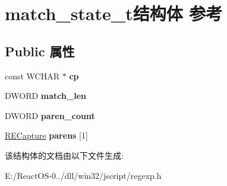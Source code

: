 \hypertarget{structmatch__state__t}{}\section{match\+\_\+state\+\_\+t结构体 参考}
\label{structmatch__state__t}
\subsection*{Public 属性}
\begin{DoxyCompactItemize}
\item 
\mbox{\label{structmatch__state__t_a8effd1384fdb94f8bc24cb4d4aa8e1f9}} 
const W\+C\+H\+AR $\ast$ {\bfseries cp}
\item 
\mbox{\label{structmatch__state__t_a29d207e7b3d550d8186223d103d62dd5}} 
D\+W\+O\+RD {\bfseries match\+\_\+len}
\item 
\mbox{\label{structmatch__state__t_ae3fadae194e8fdbc0b835c61d2632202}} 
D\+W\+O\+RD {\bfseries paren\+\_\+count}
\item 
\mbox{\label{structmatch__state__t_a3028709a531a4c57b4bf2e95203874af}} 
\hyperlink{struct_r_e_capture}{R\+E\+Capture} {\bfseries parens} \mbox{[}1\mbox{]}
\end{DoxyCompactItemize}


该结构体的文档由以下文件生成\+:\begin{DoxyCompactItemize}
\item 
E\+:/\+React\+O\+S-\/0../dll/win32/jscript/regexp.\+h\end{DoxyCompactItemize}
